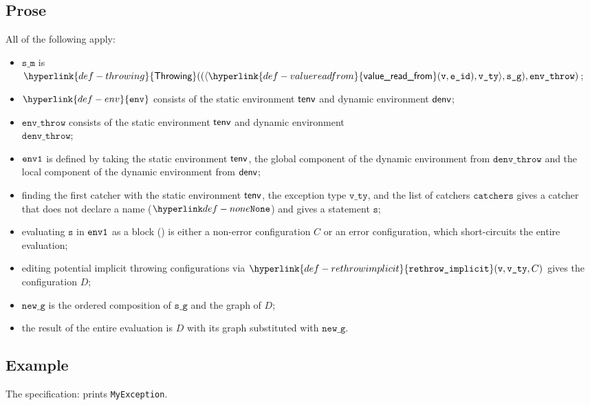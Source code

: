 \documentclass{book}
\newcommand\ProseOrError[0]{or an error configuration, which short-circuits the entire evaluation}
\newcommand\rethrowimplicit[0]{\hyperlink{def-rethrowimplicit}{\texttt{rethrow\_implicit}}}
\newcommand\valuereadfrom[0]{\hyperlink{def-valuereadfrom}{\textsf{value\_read\_from}}}
\newcommand\Throwing[0]{\hyperlink{def-throwing}{\textsf{Throwing}}}
\newcommand\env[0]{\hyperlink{def-env}{\texttt{env}}}
\newcommand\newg[0]{\texttt{new\_g}}
\newcommand\vs[0]{\texttt{s}}
\newcommand\catchers[0]{\texttt{catchers}}
\newcommand\envthrow[0]{\texttt{env\_throw}}
\newcommand\denvthrow[0]{\texttt{denv\_throw}}
\newcommand\sm[0]{\texttt{s\_m}}
\newcommand\sg[0]{\texttt{s\_g}}
\newcommand\vvty[0]{\texttt{v\_ty}}
\newcommand\eid[0]{\texttt{e\_id}}
\begin{document}
  \subsection{Prose}
  All of the following apply:
  \begin{itemize}
  \item $\sm$ is $\Throwing((\langle \valuereadfrom(\vv, \eid), \vvty \rangle, \sg), \envthrow)$;
  \item $\env$ consists of the static environment $\textsf{tenv}$ and dynamic environment $\textsf{denv}$;
  \item $\envthrow$ consists of the static environment $\textsf{tenv}$ and dynamic environment \\ $\denvthrow$;
  \item $\texttt{env1}$ is defined by taking the static environment $\textsf{tenv}$, the global component of the dynamic
  environment from $\denvthrow$ and the local component of the dynamic environment from $\textsf{denv}$;
  \item finding the first catcher with the static environment $\textsf{tenv}$, the exception type $\vvty$,
  and the list of catchers $\catchers$ gives a catcher that does not declare a name ($\None$) and gives a statement $\vs$;
  \item evaluating $\vs$ in $\texttt{env1}$ as a block () is either a non-error
  configuration $C$ \ProseOrError;
  \item editing potential implicit throwing configurations via $\rethrowimplicit(\vv, \vvty, C)$
  gives the configuration $D$;
  \item $\newg$ is the ordered composition of $\sg$ and the graph of $D$;
  \item the result of the entire evaluation is $D$ with its graph substituted with $\newg$.
  \end{itemize}

    \subsection{Example}
    The specification:
    prints \texttt{MyException}.


\end{document}
